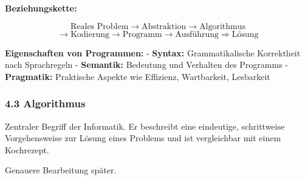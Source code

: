 \documentclass[
  11pt,
  a4paper,
  DIV=11,
  numbers=noendperiod]{scrartcl}
\begin{document}
\textbf{Beziehungskette:}

\[
\text{Reales Problem} \rightarrow \text{Abstraktion} \rightarrow \text{Algorithmus}\]
\[
\rightarrow \text{Kodierung} \rightarrow \text{Programm} \rightarrow \text{Ausführung} \Rightarrow \text{Lösung}
\]

\textbf{Eigenschaften von Programmen:} - \textbf{Syntax:}
Grammatikalische Korrektheit nach Sprachregeln - \textbf{Semantik:}
Bedeutung und Verhalten des Programms - \textbf{Pragmatik:} Praktische
Aspekte wie Effizienz, Wartbarkeit, Lesbarkeit

\subsubsection{4.3 Algorithmus}\label{algorithmus}

Zentraler Begriff der Informatik. Er beschreibt eine eindeutige,
schrittweise Vorgehensweise zur Lösung eines Problems und ist
vergleichbar mit einem Kochrezept.

Genauere Bearbeitung später.
\end{document}
